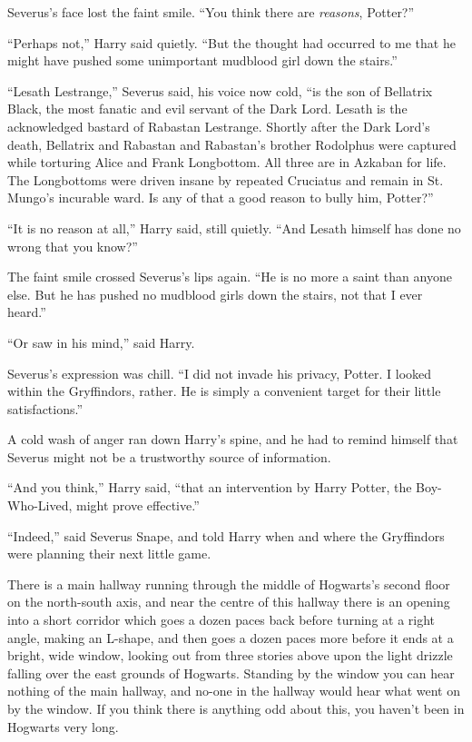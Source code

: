Severus’s face lost the faint smile. “You think there are \emph{reasons}, Potter?”

“Perhaps not,” Harry said quietly. “But the thought had occurred to me that he might have pushed some unimportant mudblood girl down the stairs.”

“Lesath Lestrange,” Severus said, his voice now cold, “is the son of Bellatrix Black, the most fanatic and evil servant of the Dark Lord. Lesath is the acknowledged bastard of Rabastan Lestrange. Shortly after the Dark Lord’s death, Bellatrix and Rabastan and Rabastan’s brother Rodolphus were captured while torturing Alice and Frank Longbottom. All three are in Azkaban for life. The Longbottoms were driven insane by repeated Cruciatus and remain in St. Mungo’s incurable ward. Is any of that a good reason to bully him, Potter?”

“It is no reason at all,” Harry said, still quietly. “And Lesath himself has done no wrong that you know?”

The faint smile crossed Severus’s lips again. “He is no more a saint than anyone else. But he has pushed no mudblood girls down the stairs, not that I ever heard.”

“Or saw in his mind,” said Harry.

Severus’s expression was chill. “I did not invade his privacy, Potter. I looked within the Gryffindors, rather. He is simply a convenient target for their little satisfactions.”

A cold wash of anger ran down Harry’s spine, and he had to remind himself that Severus might not be a trustworthy source of information.

“And you think,” Harry said, “that an intervention by Harry Potter, the Boy-Who-Lived, might prove effective.”

“Indeed,” said Severus Snape, and told Harry when and where the Gryffindors were planning their next little game.

\later

There is a main hallway running through the middle of Hogwarts’s second floor on the north-south axis, and near the centre of this hallway there is an opening into a short corridor which goes a dozen paces back before turning at a right angle, making an L-shape, and then goes a dozen paces more before it ends at a bright, wide window, looking out from three stories above upon the light drizzle falling over the east grounds of Hogwarts. Standing by the window you can hear nothing of the main hallway, and no-one in the hallway would hear what went on by the window. If you think there is anything odd about this, you haven’t been in Hogwarts very long.


